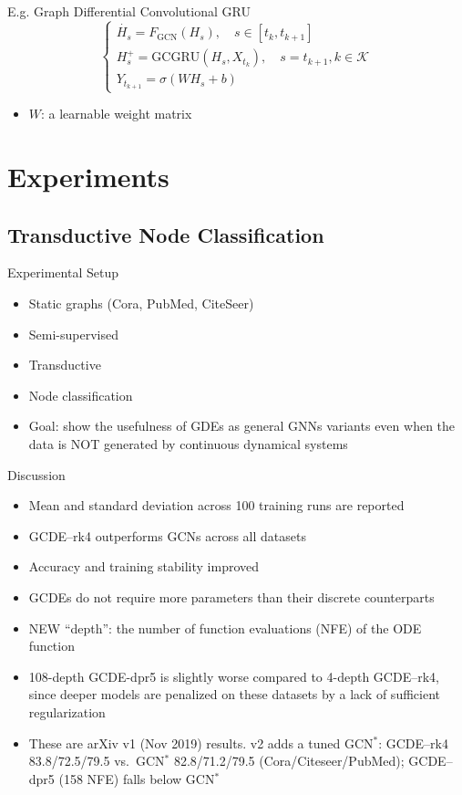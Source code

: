 \documentclass{beamer}
\begin{document}
\begin{frame}{E.g. Graph Differential Convolutional GRU}
\[
\begin{cases}
\dot{H_s}=F_\text{GCN}(H_s),\quad s\in[t_k,t_{k+1}]\\
H_s^+=\text{GCGRU}(H_s,X_{t_k}),\quad s=t_{k+1},k\in\mathcal{K}\\
Y_{t_{k+1}}=\sigma(WH_s+b)
\end{cases}
\]
\begin{itemize}
\item $W$: a learnable weight matrix
\end{itemize}
\end{frame}


\section{Experiments}
\subsection{Transductive Node Classification}
\begin{frame}{Experimental Setup}
\begin{itemize}
\item Static graphs (Cora, PubMed, CiteSeer)
\item Semi-supervised
\item Transductive
\item Node classification
\item Goal: show the usefulness of GDEs as general GNNs variants even when the data is NOT generated by continuous dynamical systems
\end{itemize}
\end{frame}
\begin{frame}{Discussion}
\begin{itemize}
\item Mean and standard deviation across 100 training runs are reported
\item GCDE–rk4 outperforms GCNs across all datasets
\item Accuracy and training stability improved
\item GCDEs do not require more parameters than their discrete counterparts
\item NEW ``depth'': the number of function evaluations (NFE) of the ODE function
\item 108-depth GCDE-dpr5 is slightly worse compared to 4-depth GCDE–rk4, since deeper models are penalized on these datasets by a lack of sufficient regularization
\item {\footnotesize These are arXiv v1 (Nov 2019) results. v2 adds a tuned GCN$^*$: GCDE–rk4 83.8/72.5/79.5 vs.\ GCN$^*$ 82.8/71.2/79.5 (Cora/Citeseer/PubMed); GCDE–dpr5 (158 NFE) falls below GCN$^*$\par}
\end{itemize}
\end{frame}
\end{document}
